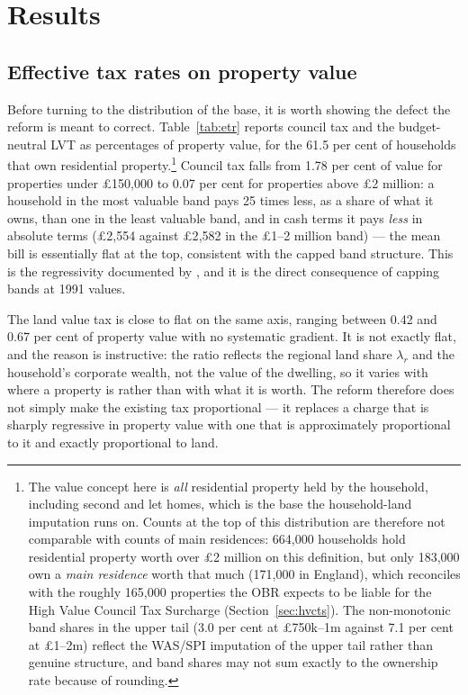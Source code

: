\section{Results}
\label{sec:results}

\subsection{Effective tax rates on property value}
\label{sec:etr}

Before turning to the distribution of the base, it is worth showing the defect the reform is meant to correct. Table~\ref{tab:etr} reports council tax and the budget-neutral LVT as percentages of property value, for the 61.5 per cent of households that own residential property.\footnote{The value concept here is \emph{all} residential property held by the household, including second and let homes, which is the base the household-land imputation runs on. Counts at the top of this distribution are therefore not comparable with counts of main residences: 664{,}000 households hold residential property worth over \pounds 2 million on this definition, but only 183{,}000 own a \emph{main residence} worth that much (171{,}000 in England), which reconciles with the roughly 165{,}000 properties the OBR expects to be liable for the High Value Council Tax Surcharge (Section~\ref{sec:hvcts}). The non-monotonic band shares in the upper tail (3.0 per cent at \pounds 750k--1m against 7.1 per cent at \pounds 1--2m) reflect the WAS/SPI imputation of the upper tail rather than genuine structure, and band shares may not sum exactly to the ownership rate because of rounding.} Council tax falls from 1.78 per cent of value for properties under \pounds 150{,}000 to 0.07 per cent for properties above \pounds 2 million: a household in the most valuable band pays 25 times less, as a share of what it owns, than one in the least valuable band, and in cash terms it pays \emph{less} in absolute terms (\pounds 2{,}554 against \pounds 2{,}582 in the \pounds 1--2 million band) --- the mean bill is essentially flat at the top, consistent with the capped band structure. This is the regressivity documented by \citet{adam2020}, and it is the direct consequence of capping bands at 1991 values.

The land value tax is close to flat on the same axis, ranging between 0.42 and 0.67 per cent of property value with no systematic gradient. It is not exactly flat, and the reason is instructive: the ratio reflects the regional land share $\lambda_r$ and the household's corporate wealth, not the value of the dwelling, so it varies with where a property is rather than with what it is worth. The reform therefore does not simply make the existing tax proportional --- it replaces a charge that is sharply regressive in property value with one that is approximately proportional to it and exactly proportional to land.

